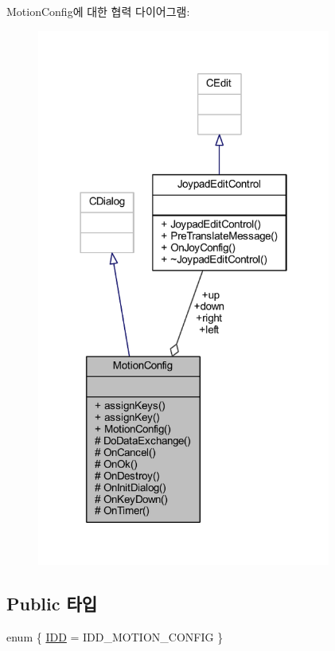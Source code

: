Motion\+Config에 대한 협력 다이어그램\+:\nopagebreak
\begin{figure}[H]
\begin{center}
\leavevmode
\includegraphics[width=274pt]{class_motion_config__coll__graph}
\end{center}
\end{figure}
\subsection*{Public 타입}
\begin{DoxyCompactItemize}
\item 
enum \{ \mbox{\hyperlink{class_motion_config_a8d6ecd105518fc0b880fdd120583c743acda326956e507e0274c3deb88512c76a}{I\+DD}} = I\+D\+D\+\_\+\+M\+O\+T\+I\+O\+N\+\_\+\+C\+O\+N\+F\+IG
 \}
\end{DoxyCompactItemize}

